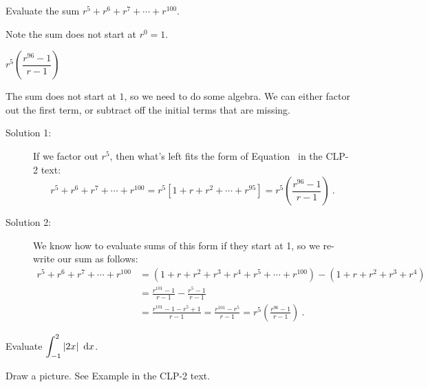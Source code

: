 \begin{Mquestion}\label{1.1geomb}
Evaluate the sum $r^5+r^6+r^7+\cdots+r^{100}$.
\end{Mquestion}
\begin{hint}
Note the sum does not start at $r^0=1$.
\end{hint}
\begin{answer}
$r^5\left(\dfrac{r^{96}-1}{r-1}\right)$
\end{answer}
\begin{solution}
The sum does not start at $1$, so we need to do some algebra. We can either factor out the first term, or subtract off the initial terms that are missing.
\begin{description}
\item[Solution 1:]
If we factor out $r^5$, then what's left fits the form of
Equation~ in the CLP-2 text:
\[r^5+r^6+r^7+\cdots+r^{100}=r^5\left[1+r+r^2+\cdots + r^{95}\right]= r^5\left(\frac{r^{96}-1}{r-1}\right)\ .\]
\item[Solution 2:] We know how to evaluate sums of this form if they start at 1, so we re-write our sum as follows:
\begin{align*}
r^5+r^6+r^7+\cdots+r^{100}&=\left(1+r+r^2+r^3+r^4+r^5+\cdots+r^{100}\right) -
\left(1+r+r^2+r^3+r^4\right) \\
&=\frac{r^{101}-1}{r-1} - \frac{r^5-1}{r-1}\\
&=\frac{r^{101}-1-r^5+1}{r-1}=\frac{r^{101}-r^5}{r-1}=r^5\left(\frac{r^{96}-1}{r-1}\right)\ .
\end{align*}
\end{description}
\end{solution}




\begin{question}[M105 2013A]\label{prob:s1.1_2}\label{1.1defintgeoma}
Evaluate ${\displaystyle\int_{-1}^2 |2x|\ \,\dee{x}}$.
\end{question}

\begin{hint}
Draw a picture. See Example  in the
CLP-2 text.
\end{hint}

